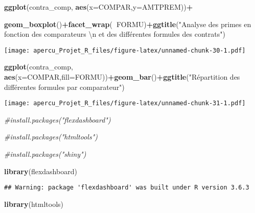 \documentclass[
]{article}
\newenvironment{Shaded}{\begin{snugshade}}{\end{snugshade}}
\newcommand{\CharTok}[1]{\textcolor[rgb]{0.31,0.60,0.02}{#1}}
\newcommand{\CommentTok}[1]{\textcolor[rgb]{0.56,0.35,0.01}{\textit{#1}}}
\newcommand{\DataTypeTok}[1]{\textcolor[rgb]{0.13,0.29,0.53}{#1}}
\newcommand{\KeywordTok}[1]{\textcolor[rgb]{0.13,0.29,0.53}{\textbf{#1}}}
\newcommand{\NormalTok}[1]{#1}
\newcommand{\OperatorTok}[1]{\textcolor[rgb]{0.81,0.36,0.00}{\textbf{#1}}}
\newcommand{\StringTok}[1]{\textcolor[rgb]{0.31,0.60,0.02}{#1}}
\begin{document}
\begin{Shaded}
\begin{Highlighting}[]
\KeywordTok{ggplot}\NormalTok{(contra_comp, }\KeywordTok{aes}\NormalTok{(}\DataTypeTok{x=}\NormalTok{COMPAR,}\DataTypeTok{y=}\NormalTok{AMTPREM))}\OperatorTok{+}

\KeywordTok{geom_boxplot}\NormalTok{()}\OperatorTok{+}\KeywordTok{facet_wrap}\NormalTok{(}\OperatorTok{~}\NormalTok{FORMU)}\OperatorTok{+}\KeywordTok{ggtitle}\NormalTok{(}\StringTok{"Analyse des primes en fonction des comparateurs }\CharTok{\textbackslash{}n}\StringTok{ et des différentes formules des contrats"}\NormalTok{)}
\end{Highlighting}
\end{Shaded}

\texttt{[image: apercu\_Projet\_R\_files/figure-latex/unnamed-chunk-30-1.pdf]}

\begin{Shaded}
\begin{Highlighting}[]
\KeywordTok{ggplot}\NormalTok{(contra_comp, }\KeywordTok{aes}\NormalTok{(}\DataTypeTok{x=}\NormalTok{COMPAR,}\DataTypeTok{fill=}\NormalTok{FORMU))}\OperatorTok{+}\KeywordTok{geom_bar}\NormalTok{()}\OperatorTok{+}\KeywordTok{ggtitle}\NormalTok{(}\StringTok{"Répartition des différentes formules par comparateur"}\NormalTok{)}
\end{Highlighting}
\end{Shaded}

\texttt{[image: apercu\_Projet\_R\_files/figure-latex/unnamed-chunk-31-1.pdf]}

\begin{Shaded}
\begin{Highlighting}[]
\CommentTok{#install.packages("flexdashboard")}

\CommentTok{#install.packages("htmltools")}

\CommentTok{#install.packages("shiny")}

\KeywordTok{library}\NormalTok{(flexdashboard)}
\end{Highlighting}
\end{Shaded}

\begin{verbatim}
## Warning: package 'flexdashboard' was built under R version 3.6.3
\end{verbatim}

\begin{Shaded}
\begin{Highlighting}[]
\KeywordTok{library}\NormalTok{(htmltools)}
\end{Highlighting}
\end{Shaded}
\end{document}

